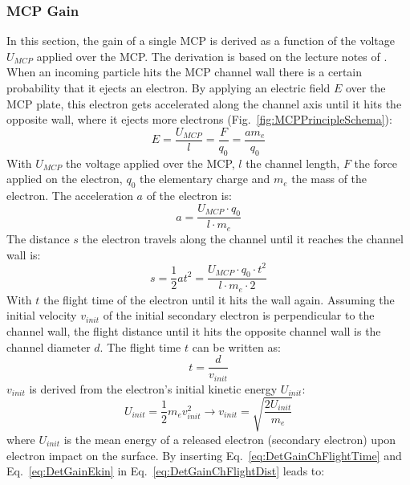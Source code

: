 	\subsubsection{MCP Gain}\label{chap:MCPGain}
	In this section, the gain of a single MCP is derived as a function of the voltage $U_{MCP}$ applied over the MCP. The derivation is based on the lecture notes of \cite{LecNot_Wurz2017}. When an incoming particle hits the MCP channel wall there is a certain probability that it ejects an electron. By applying an electric field $E$ over the MCP plate, this electron gets accelerated along the channel axis until it hits the opposite wall, where it ejects more electrons (Fig.~\ref{fig:MCPPrincipleSchema}):
	\begin{equation}
		E = \frac{U_{MCP}}{l} = \frac{F}{q_0} = \frac{a m_e}{q_0}
	\end{equation}
	With $U_{MCP}$ the voltage applied over the MCP, $l$ the channel length, $F$ the force applied on the electron, $q_0$ the elementary charge and $m_e$ the mass of the electron. The acceleration $a$ of the electron is:		
	\begin{equation}
		a = \frac{U_{MCP}\cdot q_0}{l\cdot m_e}
	\end{equation}
	The distance $s$ the electron travels along the channel until it reaches the channel wall is:
	\begin{equation}
		s = \frac{1}{2}at^2 = \frac{U_{MCP}\cdot q_0\cdot t^2}{l\cdot m_e\cdot 2}
		\label{eq:DetGainChFlightDist}
	\end{equation}
	With $t$ the flight time of the electron until it hits the wall again. Assuming the initial velocity $v_{init}$ of the initial secondary electron is perpendicular to the channel wall, the flight distance until it hits the opposite channel wall is the channel diameter $d$. The flight time $t$ can be written as:
	\begin{equation}
		t = \frac{d}{v_{init}}
		\label{eq:DetGainChFlightTime}
	\end{equation}
	$v_{init}$ is derived from the electron's initial kinetic energy $U_{init}$:
	\begin{equation}
		U_{init} = \frac{1}{2}m_e v_{init}^2 \rightarrow v_{init} = \sqrt{\frac{2U_{init}}{m_e}}
		\label{eq:DetGainEkin}
	\end{equation}
	where $U_{init}$ is the mean energy of a released electron (secondary electron) upon electron impact on the surface. By inserting Eq.~\eqref{eq:DetGainChFlightTime} and Eq.~\eqref{eq:DetGainEkin} in Eq.~\eqref{eq:DetGainChFlightDist} leads to:
